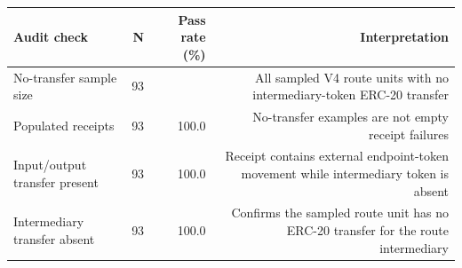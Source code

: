 \begin{tabular}{lrrr}
\toprule
Audit check & N & Pass rate (\%) & Interpretation \\
\midrule
No-transfer sample size & 93 &  & All sampled V4 route units with no intermediary-token ERC-20 transfer \\
Populated receipts & 93 & 100.0 & No-transfer examples are not empty receipt failures \\
Input/output transfer present & 93 & 100.0 & Receipt contains external endpoint-token movement while intermediary token is absent \\
Intermediary transfer absent & 93 & 100.0 & Confirms the sampled route unit has no ERC-20 transfer for the route intermediary \\
\bottomrule
\end{tabular}
